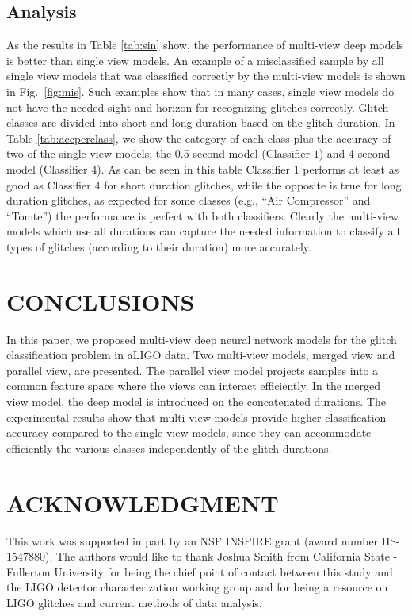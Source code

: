 \documentclass{article}
\begin{document}
\subsection{Analysis}
As the results in Table \ref{tab:sin} show, the performance of multi-view deep models is better than single view models. An example of a misclassified sample by all single view models that was classified correctly by the multi-view models is shown in Fig.~\ref{fig:mis}. Such examples show that in many cases, single view models do not have the needed sight and horizon for recognizing glitches correctly. 
Glitch classes are divided into short and long duration based on the glitch duration. In Table \ref{tab:accperclass}, we show the category of each class plus the accuracy of two of the single view models; the 0.5-second model (Classifier $1$) and 4-second model (Classifier $4$). As can be seen in this table Classifier $1$ performs at least as good as Classifier $4$ for short duration glitches, while the opposite is true for long duration glitches, as expected for some classes (e.g., ``Air Compressor'' and ``Tomte'') the performance is perfect with both classifiers. Clearly the multi-view models which use all durations can capture the needed information to classify all types of glitches (according to their duration) more accurately.

\section{CONCLUSIONS}
\label{sec:conc}
In this paper, we proposed multi-view deep neural network models for the glitch classification problem in aLIGO data. Two multi-view models, merged view and parallel view, are presented. The parallel view model projects samples into a common feature space where the views can interact efficiently. In the merged view model, the deep model is introduced on the concatenated durations. The experimental results show that multi-view models provide higher classification accuracy compared to the single view models, since they can accommodate efficiently the various classes independently of the glitch durations.
\section{ACKNOWLEDGMENT}
This work was supported in part by an NSF INSPIRE grant (award number IIS-1547880). The authors would like to thank Joshua Smith from California State - Fullerton University for being the chief point of contact between this study and the LIGO detector characterization working group and for being a resource on LIGO glitches and current methods of data analysis.



\end{document}
